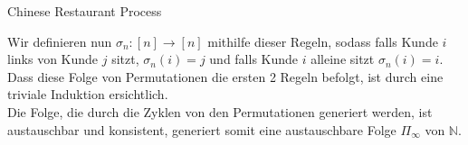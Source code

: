 \begin{section}{Chinese Restaurant Process}
\begin{enumerate}
\end{enumerate}
Wir definieren nun $\sigma_n: [n] \rightarrow [n]$ mithilfe dieser Regeln, sodass falls Kunde $i$ links von Kunde $j$ sitzt, $\sigma_n(i) = j$ und falls Kunde $i$ alleine sitzt $\sigma_n(i) = i$. Dass diese Folge von
Permutationen die ersten 2 Regeln befolgt, ist durch eine triviale Induktion ersichtlich. 
\\
Die Folge, die durch die Zyklen von den Permutationen generiert werden, ist austauschbar und konsistent, generiert somit eine austauschbare Folge $\Pi_\infty$ von $\mathbb{N}$.
\end{section}
